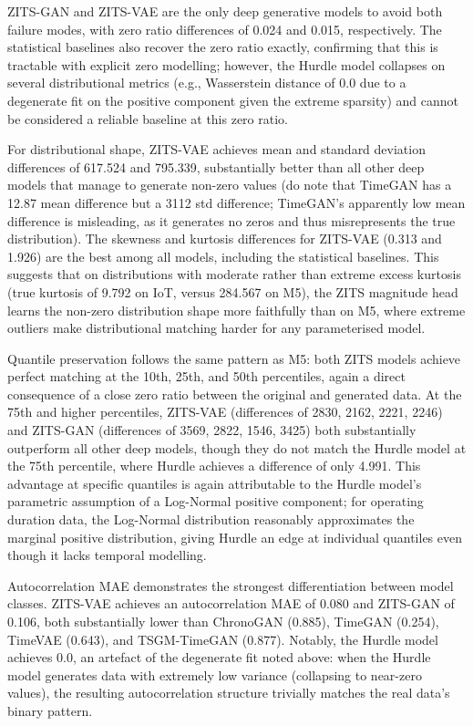 \documentclass[make,article,submit,moreauthors]{Definitions/mdpi}
\begin{document}
ZITS-GAN and ZITS-VAE are the only deep generative models to avoid both failure modes, with zero ratio differences of 0.024 and 0.015, respectively. The statistical baselines also recover the zero ratio exactly, confirming that this is tractable with explicit zero modelling; however, the Hurdle model collapses on several distributional metrics (e.g., Wasserstein distance of 0.0 due to a degenerate fit on the positive component given the extreme sparsity) and cannot be considered a reliable baseline at this zero ratio.

For distributional shape, ZITS-VAE achieves mean and standard deviation differences of 617.524 and 795.339, substantially better than all other deep models that manage to generate non-zero values (do note that TimeGAN has a 12.87 mean difference but a 3112 std difference; TimeGAN's apparently low mean difference is misleading, as it generates no zeros and thus misrepresents the true distribution). The skewness and kurtosis differences for ZITS-VAE (0.313 and 1.926) are the best among all models, including the statistical baselines. This suggests that on distributions with moderate rather than extreme excess kurtosis (true kurtosis of 9.792 on IoT, versus 284.567 on M5), the ZITS magnitude head learns the non-zero distribution shape more faithfully than on M5, where extreme outliers make distributional matching harder for any parameterised model.

Quantile preservation follows the same pattern as M5: both ZITS models achieve perfect matching at the 10th, 25th, and 50th percentiles, again a direct consequence of a close zero ratio between the original and generated data. At the 75th and higher percentiles, ZITS-VAE (differences of 2830, 2162, 2221, 2246) and ZITS-GAN (differences of 3569, 2822, 1546, 3425) both substantially outperform all other deep models, though they do not match the Hurdle model at the 75th percentile, where Hurdle achieves a difference of only 4.991. This advantage at specific quantiles is again attributable to the Hurdle model's parametric assumption of a Log-Normal positive component; for operating duration data, the Log-Normal distribution reasonably approximates the marginal positive distribution, giving Hurdle an edge at individual quantiles even though it lacks temporal modelling.

Autocorrelation MAE demonstrates the strongest differentiation between model classes. ZITS-VAE achieves an autocorrelation MAE of 0.080 and ZITS-GAN of 0.106, both substantially lower than ChronoGAN (0.885), TimeGAN (0.254), TimeVAE (0.643), and TSGM-TimeGAN (0.877). Notably, the Hurdle model achieves 0.0, an artefact of the degenerate fit noted above: when the Hurdle model generates data with extremely low variance (collapsing to near-zero values), the resulting autocorrelation structure trivially matches the real data's binary pattern. 
\end{document}
